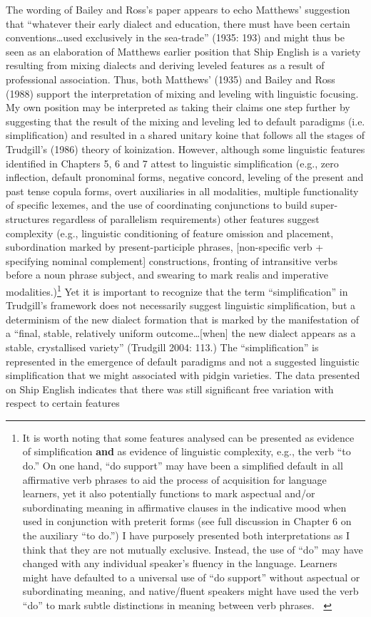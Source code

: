 \documentclass[12pt]{article}
\newenvironment{styleStandard}{\renewcommand\baselinestretch{1.0}\setlength\leftskip{0cm}\setlength\rightskip{0cm plus 1fil}\setlength\parindent{0cm}\setlength\parfillskip{0pt plus 1fil}\setlength\parskip{0in plus 1pt}\writerlistparindent\writerlistleftskip\leavevmode\normalfont\normalsize\writerlistlabel\ignorespaces}{\unskip\vspace{0in plus 1pt}\par}
\newcommand\writerlistleftskip{}
\newcommand\writerlistparindent{}
\newcommand\writerlistlabel{}
\begin{document}
\begin{styleStandard}
The wording of Bailey and Ross’s paper appears to echo Matthews’ suggestion that “whatever their early dialect and education, there must have been certain conventions…used exclusively in the sea-trade” (1935: 193) and might thus be seen as an elaboration of Matthews earlier position that Ship English is a variety resulting from mixing dialects and deriving leveled features as a result of professional association. Thus, both Matthews’ (1935) and Bailey and Ross (1988) support the interpretation of mixing and leveling with linguistic focusing. My own position may be interpreted as taking their claims one step further by suggesting that the result of the mixing and leveling led to default paradigms (i.e. simplification) and resulted in a shared unitary koine that follows all the stages of Trudgill’s (1986) theory of koinization. However, although some linguistic features identified in Chapters 5, 6 and 7 attest to linguistic simplification (e.g., zero inflection, default pronominal forms, negative concord, leveling of the present and past tense copula forms, overt auxiliaries in all modalities, multiple functionality of specific lexemes, and the use of coordinating conjunctions to build super-structures regardless of parallelism requirements) other features suggest complexity (e.g., linguistic conditioning of feature omission and placement, subordination marked by present-participle phrases, [non-specific verb + specifying nominal complement] constructions, fronting of intransitive verbs before a noun phrase subject, and swearing to mark realis and imperative modalities.)\footnote{ It is worth noting that some features analysed can be presented as evidence of simplification \textbf{and} as evidence of linguistic complexity, e.g., the verb “to do.” On one hand, “do support” may have been a simplified default in all affirmative verb phrases to aid the process of acquisition for language learners, yet it also potentially functions to mark aspectual and/or subordinating meaning in affirmative clauses in the indicative mood when used in conjunction with preterit forms (see full discussion in Chapter 6 on the auxiliary “to do.”) I have purposely presented both interpretations as I think that they are not mutually exclusive. Instead, the use of “do” may have changed with any individual speaker’s fluency in the language. Learners might have defaulted to a universal use of “do support” without aspectual or subordinating meaning, and native/fluent speakers might have used the verb “do” to mark subtle distinctions in meaning between verb phrases. \textbf{\ }} Yet it is important to recognize that the term “simplification” in Trudgill’s framework does not necessarily suggest linguistic simplification, but a determinism of the new dialect formation that is marked by the manifestation of a “final, stable, relatively uniform outcome…[when] the new dialect appears as a stable, crystallised variety” (Trudgill 2004: 113.) The “simplification” is represented in the emergence of default paradigms and not a suggested linguistic simplification that we might associated with pidgin varieties. The data presented on Ship English indicates that there was still significant free variation with respect to certain features 
\end{styleStandard}
\end{document}
